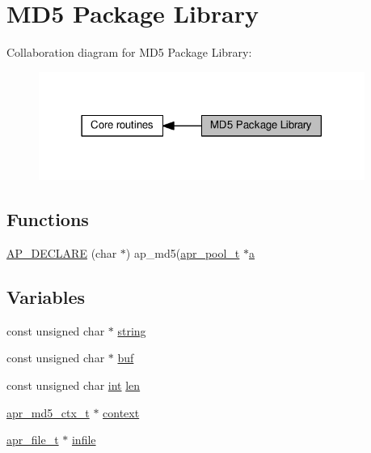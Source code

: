 \hypertarget{group__APACHE__CORE__MD5}{}\section{M\+D5 Package Library}
\label{group__APACHE__CORE__MD5}
Collaboration diagram for M\+D5 Package Library\+:
\nopagebreak
\begin{figure}[H]
\begin{center}
\leavevmode
\includegraphics[width=302pt]{group__APACHE__CORE__MD5}
\end{center}
\end{figure}
\subsection*{Functions}
\begin{DoxyCompactItemize}
\item 
\hyperlink{group__APACHE__CORE__MD5_ga8f6db3e4fa1dd07b06ef9add2a1167f9}{A\+P\+\_\+\+D\+E\+C\+L\+A\+RE} (char $\ast$) ap\+\_\+md5(\hyperlink{structapr__pool__t}{apr\+\_\+pool\+\_\+t} $\ast$\hyperlink{pcre_8txt_a841271aab70f5cda9412a19c7753f02c}{a}
\end{DoxyCompactItemize}
\subsection*{Variables}
\begin{DoxyCompactItemize}
\item 
const unsigned char $\ast$ \hyperlink{group__APACHE__CORE__MD5_gabde23016257c8e879f2411acb3f9a597}{string}
\item 
const unsigned char $\ast$ \hyperlink{group__APACHE__CORE__MD5_ga15c3223b2bd62642545a6a0fecf9ca9b}{buf}
\item 
const unsigned char \hyperlink{pcre_8txt_a42dfa4ff673c82d8efe7144098fbc198}{int} \hyperlink{group__APACHE__CORE__MD5_ga76009fbc1e6687fe24b78030a9d036ae}{len}
\item 
\hyperlink{structapr__md5__ctx__t}{apr\+\_\+md5\+\_\+ctx\+\_\+t} $\ast$ \hyperlink{group__APACHE__CORE__MD5_ga651ed26971b1d49911883c4eb87db1ad}{context}
\item 
\hyperlink{structapr__file__t}{apr\+\_\+file\+\_\+t} $\ast$ \hyperlink{group__APACHE__CORE__MD5_ga3fb008193e92b33c1bb53a980b708b75}{infile}
\end{DoxyCompactItemize}


